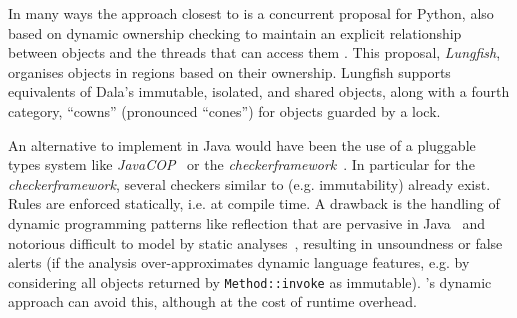 In many ways the approach closest to \dala is a concurrent proposal for Python, also based on
dynamic ownership checking to maintain an explicit relationship
between objects and the threads that can access them
\cite{pyrona2025}. This proposal, \textit{Lungfish}, organises objects
in regions based on their ownership. Lungfish supports equivalents of
Dala's immutable, isolated, and shared objects, along with a fourth
category, ``cowns'' (pronounced ``cones'') for objects guarded by a
lock.

An alternative to implement \dala in Java would have been the use of a pluggable types system like \textit{JavaCOP}~\cite{markstrum2010javacop} or the \textit{checkerframework}~\cite{ernst2010building}. In particular for the \textit{checkerframework}, several checkers similar to \dala (e.g. immutability) already exist. Rules are enforced statically, i.e. at compile time. 
A drawback is the handling of dynamic programming patterns like reflection that are pervasive in Java~\cite{sui2020recall} and notorious difficult to model by static analyses~\cite{ernst2003static,livshits2015defense}, resulting in unsoundness or false alerts (if the analysis over-approximates dynamic language features, e.g. by considering all objects returned by \texttt{Method::invoke} as immutable). \jdala's dynamic approach can avoid this, although at the cost of runtime overhead.
